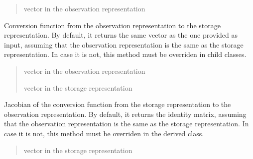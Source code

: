 \documentclass[letterpaper,10pt,english]{sphinxmanual}
\begin{document}
\begin{fulllineitems}
\begin{fulllineitems}
\begin{quote}
\begin{description}
\sphinxAtStartPar
vector in the observation representation

\end{description}\end{quote}

\end{fulllineitems}


\begin{fulllineitems}
\label{\detokenize{FEKFMBLocalization:MapFeature.MapFeature.o2s}}
\pysigstartsignatures
{}
\pysigstopsignatures
\sphinxAtStartPar
Conversion function from the observation representation to the storage representation. By default, it returns the
same vector as the one provided as input, assuming that the observation representation is the same as the storage representation.
In case it is not, this method must be overriden in child classes.
\begin{quote}\begin{description}
\sphinxAtStartPar
{} \textendash{} vector in the observation representation

\sphinxAtStartPar
vector in the storage representation

\end{description}\end{quote}

\end{fulllineitems}


\begin{fulllineitems}
\label{\detokenize{FEKFMBLocalization:MapFeature.MapFeature.J_s2o}}
\pysigstartsignatures
{}
\pysigstopsignatures
\sphinxAtStartPar
Jacobian of the conversion function from the storage representation to the observation representation.
By default, it returns the identity matrix, assuming that the observation representation is the same as the storage representation.
In case it is not, this method must be overriden in the derived class.
\begin{quote}\begin{description}
\sphinxAtStartPar
{} \textendash{} vector in the storage representation


\end{description}
\end{quote}
\end{fulllineitems}
\end{fulllineitems}
\end{document}
